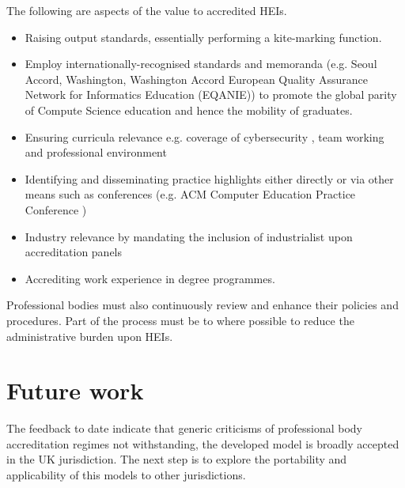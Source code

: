 \documentclass[sigconf]{acmart}
\begin{document}
The following are aspects of the value to accredited HEIs.

\begin{itemize}
	\item {Raising output standards, essentially performing a kite-marking function.}
	\item {Employ internationally-recognised standards and memoranda (e.g. Seoul Accord, Washington, Washington Accord European Quality Assurance Network for Informatics Education (EQANIE)) to promote the global parity of Compute Science education and hence the mobility of graduates.} 
	\item {Ensuring curricula relevance e.g. coverage of cybersecurity \cite{Cricketal2019}, team working and professional environment}
	\item {Identifying and disseminating practice highlights either directly \cite{practice_highlights_2020} or via other means such as conferences (e.g. ACM Computer Education Practice Conference \cite{CrickEtAl2020Cep}} )
	\item {Industry relevance by mandating the inclusion of industrialist upon accreditation panels} 
	\item {Accrediting work experience in degree programmes.}
\end{itemize}

Professional bodies must also continuously review and enhance their policies and procedures. Part of the process must be to where possible to reduce the administrative burden upon HEIs.

\section{Future work}
The feedback to date indicate that generic criticisms of professional body accreditation regimes not withstanding, the developed model is broadly accepted in the UK jurisdiction. The next step is to explore the portability and applicability of this models to other jurisdictions.  

\begin{comment}


\subsection{Acknowledgements}
Many have contributed to this work: BCS Assessors; visited BCS Education Affiliate HEI's; respondants to surveys; BCS AAC and BCS Accreditation Team.

\end{comment}


%



% 
\end{document}
